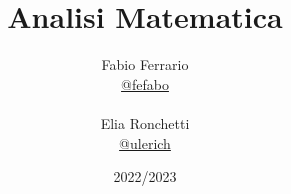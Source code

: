 \documentclass[12pt, a4paper, openany]{book}
\begin{document}
\title{Analisi Matematica}
\author{
	Fabio Ferrario\\
	\small{\href{https://t.me/fefabo}{@fefabo}}
	\\\\Elia Ronchetti\\
	\small{\href{https://t.me/ulerich}{@ulerich}}
}
\date{2022/2023}
\maketitle

\tableofcontents
















\end{document}
